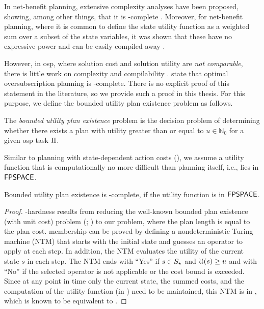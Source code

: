 In net-benefit planning, extensive complexity analyses have been proposed, showing, among other things, that it is \PSPACE{}-complete \autocite{aghighi-jonsson-aaai2014,aghighi-backstrom-ijcai2015}.
Moreover, for net-benefit planning, where it is common to define the state utility function as a weighted sum over a subset of the state variables, it was shown that these have no expressive power and can be easily compiled away \autocite{keyder-geffner-jair2009}.

However, in osp, where solution cost and solution utility are \emph{not comparable}, there is little work on complexity and compilability \autocite{katz-mirkis-ijcai2016}.
\textcite{katz-mirkis-ijcai2016} state that optimal oversubscription planning is \PSPACE{}-complete.
There is no explicit proof of this statement in the literature, so we provide such a proof in this thesis. 
For this purpose, we define the bounded utility plan existence problem as follows.

\begin{definition}\label{def:osp_plan_existence}
    The \emph{bounded utility plan existence} problem is the decision problem of determining whether there exists a plan with utility greater than or equal to $u \in \mathbb{N}_0$ for a given osp task $\Pi$.
\end{definition}

Similar to planning with state-dependent action costs (), we assume a utility function that is computationally no more difficult than planning itself, i.e., lies in $\mathsf{FPSPACE}$.

\begin{theorem}\label{thm:osp_space}
    Bounded utility plan existence is \PSPACE{}-complete, if the utility function is in $\mathsf{FPSPACE}$.
\end{theorem}

\begin{proof}
    \PSPACE{}-hardness results from reducing the well-known bounded plan existence (with unit cost) problem (; \cite{bylander-aij1994}) to our problem, where the plan length is equal to the plan cost. \PSPACE{} membership can be proved by defining a nondeterministic Turing machine (NTM) that starts with the initial state and guesses an operator to apply at each step.
    In addition, the NTM evaluates the utility of the current state $s$ in each step. The NTM ends with ``Yes'' if $s \in S_\star$ and $\mathcal U{}(s) \geq u$ and with ``No'' if the selected operator is not applicable or the cost bound is exceeded.
    Since at any point in time only the current state, the summed costs, and the computation of the utility function (in \FPSPACE{}) need to be maintained, this NTM is in \NPSPACE{}, which is known to be equivalent to \PSPACE{} \autocite{savitch-jcss1970}.
\end{proof}

